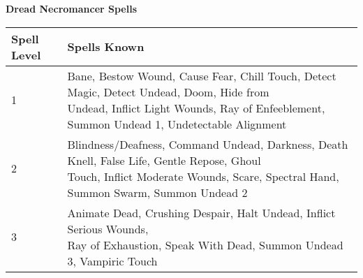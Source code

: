 \textbf{\large{Dread Necromancer Spells}}
\begin{center}
\begin{adjustwidth}{-4cm}{}
\begin{small}
\begin{tabular}{| l | l |}
\hline
Spell Level &Spells Known \\
\hline
1 &\makecell{Bane, Bestow Wound, Cause Fear, Chill Touch, Detect Magic, Detect Undead, Doom, Hide from\\ Undead, Inflict Light Wounds, Ray of Enfeeblement, Summon Undead 1, Undetectable Alignment} \\
2 &\makecell{Blindness/Deafness, Command Undead, Darkness, Death Knell, False Life, Gentle Repose, Ghoul\\ Touch, Inflict Moderate Wounds, Scare, Spectral Hand, Summon Swarm, Summon Undead 2} \\
3 &\makecell{Animate Dead, Crushing Despair, Halt Undead, Inflict Serious Wounds,\\ Ray of Exhaustion, Speak With Dead, Summon Undead 3, Vampiric Touch} \\
\hline
\end{tabular}
\end{small}
\end{adjustwidth}
\end{center}
